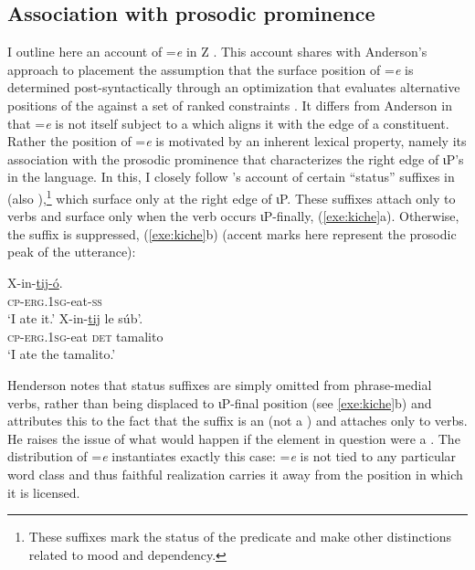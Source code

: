 \documentclass[output=paper,
modfonts
]{LSP/langsci}
\begin{document}
\subsection{Association with prosodic prominence}
I outline here an account of  =\emph{e} in Z . This account shares with Anderson's \citeyear{anderson2005} approach to  placement the assumption that the surface position
 of =\emph{e} is determined post-syntactically through an optimization that evaluates alternative positions of the  against a set of ranked constraints  \citep{prince1993}. 
  It differs from Anderson in that  =\emph{e} is not itself subject to a  which aligns it with the edge of a constituent. Rather the position of =\emph{e} is motivated by an 
inherent lexical property, namely its association with the prosodic prominence that characterizes the right edge of ιP's in the language.
 In this, I closely follow  \cite{henderson2012ais}'s account of certain ``status'' suffixes in  (also ),\footnote 
{These suffixes mark the  status of the predicate and make other distinctions related to mood and dependency.} 
which surface only at the right edge of ιP. These suffixes attach only to verbs
and surface only when the verb occurs ιP-finally, (\ref{exe:kiche}a). Otherwise, the suffix is suppressed, (\ref{exe:kiche}b)  (accent marks here represent the prosodic
peak of the utterance):
\begin{exe}
\ex
\begin{xlist}
\gll X-in-\underline{tij-\'o}. \\
\textsc{cp-erg.1sg}-eat-\textsc{ss} \\
\glt `I ate it.'
\gll X-in-\underline{tij} le s\'ub'. \\
\textsc{cp-erg.1sg}-eat \textsc{det} tamalito \\
\glt `I ate the tamalito.' \citep[775--776]{henderson2012ais}
\end{xlist}
\label{exe:kiche}
\end{exe}
Henderson notes that status suffixes are simply omitted from phrase-medial verbs, rather than being displaced to ιP-final position
(see \ref{exe:kiche}b) and attributes this to the fact that the suffix is an  (not a ) and attaches only to verbs.
 He raises the issue of what would happen if the element in question were a . 
The distribution of  =\emph{e} instantiates exactly this case: =\emph{e} is not tied to any particular
word class and thus faithful realization carries it away from the position in which it is licensed.
\end{document}
